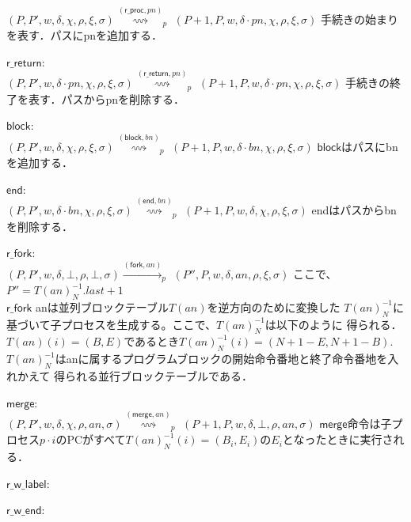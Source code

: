 \documentclass[submit,PRO]{ipsj}
\newcommand{\bcode}[1]{$\mathsf{#1}$}
\newcommand{\brightarrow}[1]{\stackrel{#1}{\rightsquigarrow}}
\begin{document}
\begin{list}
$(P,P',w,\delta,\chi,\rho,\xi,\sigma)\brightarrow{(\mathsf{r\_proc},pn)}_p$\newline
\qquad $(P+1,P,w,\delta\cdot pn,\chi,\rho,\xi,\sigma)$\newline
手続きの始まりを表す．パスにpnを追加する．
\item \bcode{r\_return}:\\
$(P,P',w,\delta\cdot pn,\chi,\rho,\xi,\sigma)\brightarrow{(\mathsf{r\_return},pn)}_p$\newline
\qquad $(P+1,P,w,\delta\cdot pn,\chi,\rho,\xi,\sigma)$\newline
手続きの終了を表す．パスからpnを削除する．
\item \bcode{block}:\\
$(P,P',w,\delta,\chi,\rho,\xi,\sigma)\brightarrow{(\mathsf{block},bn)}_p$\newline
\qquad $(P+1,P,w,\delta\cdot bn,\chi,\rho,\xi,\sigma)$\newline
\bcode{block}はパスにbnを追加する．
\item \bcode{end}:\\
$(P,P',w,\delta\cdot bn,\chi,\rho,\xi,\sigma)\brightarrow{(\mathsf{end},bn)}_p$\newline
\qquad $(P+1,P,w,\delta,\chi,\rho,\xi,\sigma)$\newline
endはパスからbnを削除する．
\item \bcode{r\_fork}:\\
$(P,P',w,\delta,\bot,\rho,\bot,\sigma)\xrightarrow{(\mathsf{fork},an)}_p$\newline
\qquad $(P'',P,w,\delta,an,\rho,\xi,\sigma)$\newline
ここで、$P''=T(an)^{-1}_N.last+1$\\
\bcode{r\_fork} anは並列ブロックテーブル$T(an)$を逆方向のために変換した
$T(an)^{-1}_N$に基づいて子プロセスを生成する。ここで、$T(an)^{-1}_N$は以下のように
得られる．
$T(an)(i)=(B,E)$であるとき$T(an)^{-1}_N(i)=(N+1-E,N+1-B)$.
$T(an)^{-1}_N$はanに属するプログラムブロックの開始命令番地と終了命令番地を入れかえて
得られる並行ブロックテーブルである．
\item \bcode{merge}:\\
$(P,P',w,\delta,\chi,\rho,an,\sigma)\brightarrow{(\mathsf{merge},an)}_p$\newline
\qquad $(P+1,P,w,\delta,\bot,\rho,an,\sigma)$\newline
\bcode{merge}命令は子プロセス$p\cdot i$のPCがすべて$T(an)^{-1}_N(i)=(B_i,E_i)$の$E_i$となったときに実行される．
\item \bcode{r\_w\_label}:
\item \bcode{r\_w\_end}:
\end{list}
\end{document}
